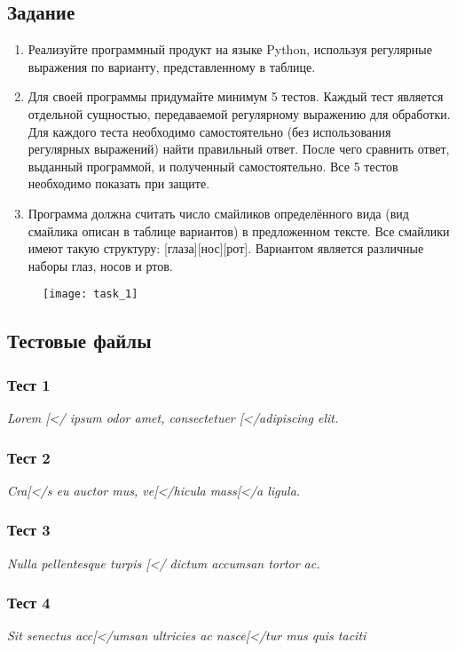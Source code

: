 \subsection*{Задание}

\begin{enumerate}
\item Реализуйте программный продукт на языке Python, используя регулярные выражения по варианту, представленному в таблице.
\item Для своей программы придумайте минимум 5 тестов. Каждый тест является отдельной сущностью, передаваемой регулярному выражению для обработки. Для каждого теста необходимо самостоятельно (без использования регулярных выражений) найти правильный ответ. После чего сравнить ответ, выданный программой, и полученный самостоятельно. Все 5 тестов необходимо показать при защите.
\item Программа должна считать число смайликов определённого вида (вид смайлика описан в таблице вариантов) в предложенном тексте. Все смайлики имеют такую структуру: [глаза][нос][рот]. Вариантом является различные наборы глаз, носов и ртов.
\end{enumerate}

\begin{figure}[h]
	\centering
	\texttt{[image: task\_1]}
\end{figure}

\subsection*{Тестовые файлы}
\subsubsection*{Тест 1}
\textit{Lorem [</ ipsum odor amet, consectetuer [</adipiscing elit.}

\subsubsection*{Тест 2}
\textit{Cra[</s eu auctor mus, ve[</hicula mass[</a ligula.}

\subsubsection*{Тест 3}
\textit{Nulla pellentesque turpis [</ dictum accumsan tortor ac.}

\subsubsection*{Тест 4}
\textit{Sit senectus acc[</umsan ultricies ac nasce[</tur mus quis taciti}

